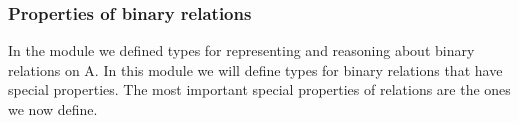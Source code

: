 \subsubsection{Properties of binary relations}
\label{props-of-bin-rels}
In the  module we defined types for representing and reasoning about binary relations on \ab A. In this module we will define types for binary relations that have special properties. The most important special properties of relations are the ones we now define.
\ccpad
\begin{code}%
\>[0][@{}l@{\AgdaIndent{0}}]%
\>[1]\AgdaSpace{}%
\AgdaSymbol{:}\AgdaSpace{}%
\AgdaSymbol{\{}\AgdaSpace{}%
\AgdaSymbol{:}\AgdaSpace{}%
\AgdaSpace{}%
\AgdaSymbol{\}}\AgdaSpace{}%
\AgdaSpace{}%
\AgdaSpace{}%
\AgdaSpace{}%
\AgdaSpace{}%
\AgdaSpace{}%
\AgdaSpace{}%
\AgdaSpace{}%
\AgdaSpace{}%
\<%
\\
%
\>[1]\AgdaSpace{}%
\AgdaSpace{}%
\AgdaSymbol{=}\AgdaSpace{}%
\AgdaSymbol{\}}\AgdaSpace{}%
\AgdaSpace{}%
\AgdaSpace{}%
\AgdaSpace{}%
\<%
\\
%
\\[\AgdaEmptyExtraSkip]%
%
\>[1]\AgdaSpace{}%
\AgdaSymbol{:}\AgdaSpace{}%
\AgdaSymbol{\{}\AgdaSpace{}%
\AgdaSymbol{:}\AgdaSpace{}%
\AgdaSpace{}%
\AgdaSymbol{\}}\AgdaSpace{}%
\AgdaSpace{}%
\AgdaSpace{}%
\AgdaSpace{}%
\AgdaSpace{}%
\AgdaSpace{}%
\AgdaSpace{}%
\AgdaSpace{}%
\AgdaSpace{}%
\<%
\\

\end{code}
